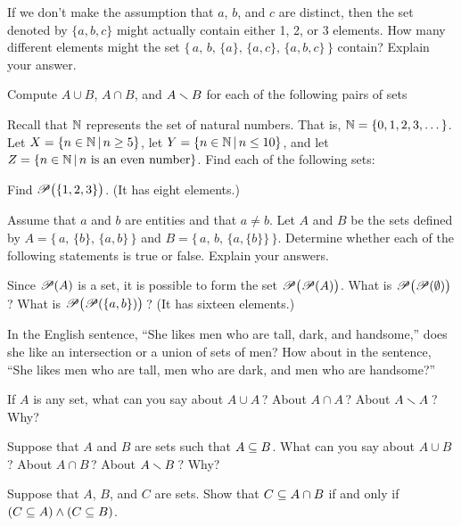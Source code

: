 \begin{exercises}

\problem If we don't make the assumption that $a$, $b$, and $c$ are distinct,
then the set denoted by $\{a,b,c\}$ might actually contain either 1, 2, or 3 
elements.  How many different elements might the set
$\{\,a,\,b,\,\{a\},\,\{a,c\},\,\{a,b,c\}\,\}$
contain?  Explain your answer.

\problem Compute $A\cup B$, $A\cap B$, and $A\smallsetminus B$ for each of the following
pairs of sets

\problem Recall that ${\mathbb N}$ represents the set of natural numbers.  That is,
${\mathbb N}=\{0,1,2,3,\dots\}$.  Let $X=\{n\in{\mathbb N}\,|\, n\ge 5\}$,
let $Y=\{n\in{\mathbb N}\,|\, n\le10\}$, and let $Z=\{n\in{\mathbb N}\,|\, \text{$n$ is an even number}\}$.
Find each of the following sets:


\problem Find ${\mathscr P}\big(\{1,2,3\}\big)$. (It has eight elements.)

\problem Assume that $a$ and $b$ are entities and that $a\not=b$. Let $A$ and $B$ be the sets defined by
$A=\{\,a,\,\{b\},\,\{a,b\}\,\}$ and $B=\{\,a,\,b,\,\{a,\{b\}\}\,\}$.
Determine whether each of the following statements is true or false.  Explain
your answers.

\problem Since ${\mathscr P}(A)$ is a set, it is possible to form the set
${\mathscr P}\big({\mathscr P}(A)\big)$.  What is ${\mathscr P}\big({\mathscr P}(\emptyset)\big)\,$?
What is ${\mathscr P}\big({\mathscr P}(\{a,b\})\big)\,$? (It has sixteen elements.)

\problem In the English sentence, ``She likes men who are tall, dark, and
handsome,'' does she like an intersection or a union of sets of men?
How about in the sentence, ``She likes men who are tall, men who are dark,
and men who are handsome?''

\problem If $A$ is any set, what can you say about $A\cup A\,$?
About $A\cap A\,$?  About $A\smallsetminus A\,$?  Why?

\problem Suppose that $A$ and $B$ are sets such that $A\subseteq B$.
What can you say about $A\cup B\,$?  About $A\cap B\,$?
About $A\smallsetminus B\,$?  Why?

\problem Suppose that $A$, $B$, and $C$ are sets.  Show that
$C\subseteq A\cap B$ if and only if $(C\subseteq A)\wedge (C\subseteq B)$.


\end{exercises}
